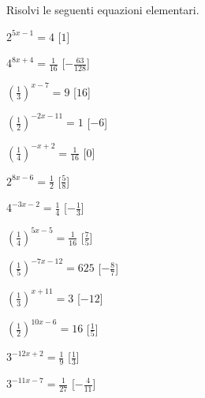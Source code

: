 \begin{esercizio}\label{ese:}
 Risolvi le seguenti equazioni elementari.
\begin{multicols}{2}
 \begin{enumeratea}
  \item  \(2^{5 x -1} = 4\)
   \hfill [\(1\)]
  \item  \(4^{8 x +4} = \frac{1}{16}\)
   \hfill [\(-\frac{63}{128}\)]
  \item  \(\left(\frac{1}{3}\right)^{x -7} = 9\)
   \hfill [\(16\)]
  \item  \(\left(\frac{1}{2}\right)^{-2 x -11} = 1\)
   \hfill [\(-6\)]
  \item  \(\left(\frac{1}{4}\right)^{- x +2} = \frac{1}{16}\)
   \hfill [\(0\)]
  \item  \(2^{8 x -6} = \frac{1}{2}\)
   \hfill [\(\frac{5}{8}\)]
  \item  \(4^{-3 x -2} = \frac{1}{4}\)
   \hfill [\(-\frac{1}{3}\)]
  \item  \(\left(\frac{1}{4}\right)^{5 x -5} = \frac{1}{16}\)
   \hfill [\(\frac{7}{5}\)]
  \item  \(\left(\frac{1}{5}\right)^{-7 x -12} = 625\)
   \hfill [\(-\frac{8}{7}\)]
  \item  \(\left(\frac{1}{3}\right)^{x +11} = 3\)
   \hfill [\(-12\)]
  \item  \(\left(\frac{1}{2}\right)^{10 x -6} = 16\)
   \hfill [\(\frac{1}{5}\)]
  \item  \(3^{-12 x +2} = \frac{1}{9}\)
   \hfill [\(\frac{1}{3}\)]
  \item  \(3^{-11 x -7} = \frac{1}{27}\)
   \hfill [\(-\frac{4}{11}\)]   
 \end{enumeratea}
 \end{multicols}
\end{esercizio}


